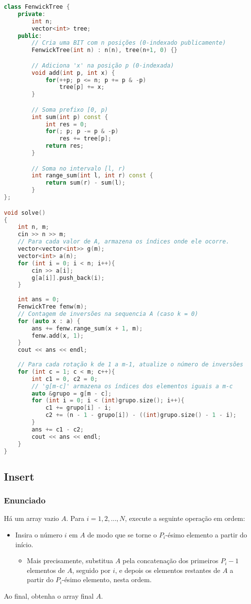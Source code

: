 \begin{lstlisting}[language=C++]
class FenwickTree {
    private:
        int n;
        vector<int> tree;
    public:
        // Cria uma BIT com n posições (0-indexado publicamente)
        FenwickTree(int n) : n(n), tree(n+1, 0) {}

        // Adiciona 'x' na posição p (0-indexada)
        void add(int p, int x) {
            for(++p; p <= n; p += p & -p)
                tree[p] += x;
        }

        // Soma prefixo [0, p)
        int sum(int p) const {
            int res = 0;
            for(; p; p -= p & -p)
                res += tree[p];
            return res;
        }

        // Soma no intervalo [l, r)
        int range_sum(int l, int r) const {
            return sum(r) - sum(l);
        }
};

void solve()
{
    int n, m;
    cin >> n >> m;
    // Para cada valor de A, armazena os índices onde ele ocorre.
    vector<vector<int>> g(m);
    vector<int> a(n);
    for (int i = 0; i < n; i++){
        cin >> a[i];
        g[a[i]].push_back(i);
    }
    
    int ans = 0;
    FenwickTree fenw(m);
    // Contagem de inversões na sequencia A (caso k = 0)
    for (auto x : a) {
        ans += fenw.range_sum(x + 1, m);
        fenw.add(x, 1);
    }
    cout << ans << endl;
    
    // Para cada rotação k de 1 a m-1, atualize o número de inversões
    for (int c = 1; c < m; c++){
        int c1 = 0, c2 = 0;
        // 'g[m-c]' armazena os índices dos elementos iguais a m-c
        auto &grupo = g[m - c];
        for (int i = 0; i < (int)grupo.size(); i++){
            c1 += grupo[i] - i;
            c2 += (n - 1 - grupo[i]) - ((int)grupo.size() - 1 - i);
        }
        ans += c1 - c2;
        cout << ans << endl;
    }
}
\end{lstlisting}

\subsection{Insert}

\subsubsection*{Enunciado}
Há um array vazio \(A\). Para \(i = 1, 2, \dots, N\), execute a seguinte operação em ordem:
\begin{itemize}
    \item Insira o número \(i\) em \(A\) de modo que se torne o \(P_i\)-ésimo elemento a partir do início.
    \begin{itemize}
        \item Mais precisamente, substitua \(A\) pela concatenação dos primeiros \(P_i - 1\) elementos de \(A\), seguido por \(i\), e depois os elementos restantes de \(A\) a partir do \(P_i\)-ésimo elemento, nesta ordem.
    \end{itemize}
\end{itemize}
Ao final, obtenha o array final \(A\).

